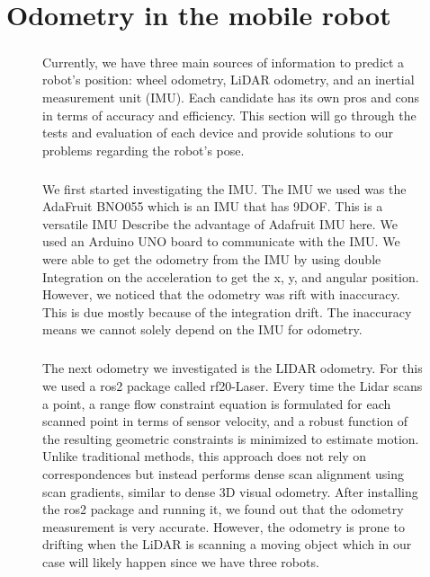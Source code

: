 \chapter{Odometry in the mobile robot}

\begin{figure} [H]

\paragraph*{}

Currently, we have three main sources of information to predict a robot's position: wheel odometry, LiDAR odometry, and an inertial measurement unit (IMU). Each candidate has its own pros and cons in terms of accuracy and efficiency. This section will go through the tests and evaluation of each device and provide solutions to our problems regarding the robot's pose.
\paragraph*{}
We first started investigating the IMU. The IMU we used was the AdaFruit BNO055 which is an IMU that has 9DOF. This is a versatile IMU {Describe the advantage of Adafruit IMU here}. We used an Arduino UNO board to communicate with the IMU. We were able to get the odometry from the IMU by using double Integration on the acceleration to get the x, y, and angular position. However, we noticed that the odometry was rift with inaccuracy. This is due mostly because of the integration drift. The inaccuracy means we cannot solely depend on the IMU for odometry.

\paragraph*{}
The next odometry we investigated is the LIDAR odometry. For this we used a ros2 package called rf20-Laser. Every time the Lidar scans a point, a range flow constraint equation is formulated for each scanned point in terms of sensor velocity, and a robust function of the resulting geometric constraints is minimized to estimate motion. Unlike traditional methods, this approach does not rely on correspondences but instead performs dense scan alignment using scan gradients, similar to dense 3D visual odometry. After installing the ros2 package and running it, we found out that the odometry measurement is very accurate. However, the odometry is prone to drifting when the LiDAR is scanning a moving object which in our case will likely happen since we have three robots. 


\end{figure}
